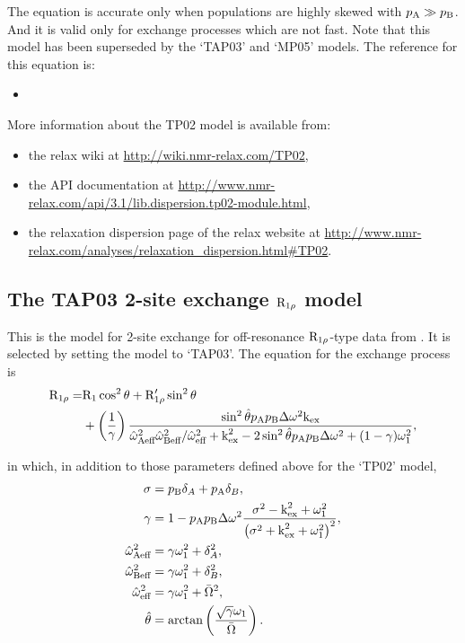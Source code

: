 The equation is accurate only when populations are highly skewed with $p_\textrm{A} \gg p_\textrm{B}$.
And it is valid only for exchange processes which are not fast.
Note that this model has been superseded by the `TAP03' and `MP05' models.
The reference for this equation is:
\begin{itemize}
  \item {}
\end{itemize}

More information about the TP02 model is available from:
\begin{itemize}
  \item the relax wiki at \url{http://wiki.nmr-relax.com/TP02},
  \item the API documentation at \url{http://www.nmr-relax.com/api/3.1/lib.dispersion.tp02-module.html},
  \item the relaxation dispersion page of the relax website at \url{http://www.nmr-relax.com/analyses/relaxation\_dispersion.html#TP02}.
\end{itemize}



\subsection{The TAP03 2-site exchange $\mathrm{R}_{1\rho}$ model}
\label{sect: dispersion: TAP03 model}

This is the model for 2-site exchange for off-resonance $\mathrm{R}_{1\rho}$-type data from \citet{Trott03}.
It is selected by setting the model to `TAP03'.
The equation for the exchange process is
\begin{align}
    \mathrm{R}_{1\rho} = & \mathrm{R}_1\cos^2\theta + \mathrm{R}_{1\rho}'\sin^2\theta \nonumber \\
               & + \left( \frac{1}{\gamma} \right) 
                        \frac{\sin^2\hat\theta p_\textrm{A}p_\textrm{B}\Delta\omega^2\textrm{k}_\textrm{ex}}{\hat\omega_\textrm{Aeff}^2\hat\omega_\textrm{Beff}^2/\hat\omega_\textrm{eff}^2 + \textrm{k}_\textrm{ex}^2 - 2\sin^2\hat\theta p_\textrm{A}p_\textrm{B}\Delta\omega^2 + (1 - \gamma)\omega_1^2},
\end{align}

in which, in addition to those parameters defined above for the `TP02' model,
\begin{subequations}
\begin{align}
    \sigma &= p_\textrm{B}\delta_A + p_\textrm{A}\delta_B, \\
    \gamma &= 1 - p_\textrm{A}p_\textrm{B}\Delta\omega^2 \frac{\sigma^2 - \textrm{k}_\textrm{ex}^2 + \omega_1^2}{\left( \sigma^2 + \textrm{k}_\textrm{ex}^2 + \omega_1^2 \right)^2}, \\
    \hat\omega_\textrm{Aeff}^2 &= \gamma\omega_1^2 + \delta_A^2, \\
    \hat\omega_\textrm{Beff}^2 &= \gamma\omega_1^2 + \delta_B^2, \\
    \hat\omega_\textrm{eff}^2 &= \gamma\omega_1^2 + \bar\Omega^2, \\
    \hat\theta &= \arctan \left( \frac{\sqrt{\gamma}\omega_1}{\bar\Omega} \right).
\end{align}
\end{subequations}

